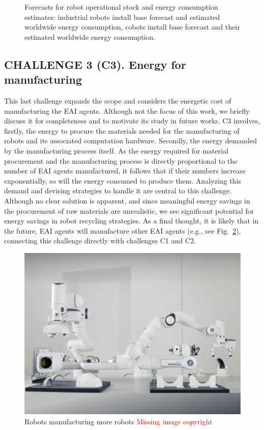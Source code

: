 \begin{figure}[!t]
	\hspace*{\fill}    
	\caption[] {\label{fig:robot_forecasts} Forecasts for robot operational stock and energy consumption estimates:  industrial robots install base forecast and  estimated worldwide energy consumption,  cobots install base forecast and their  estimated worldwide energy consumption.}
\end{figure}

\subsection{\textbf{CHALLENGE 3} (C3). Energy for manufacturing}
This last challenge expands the scope and considers the energetic cost of manufacturing the EAI agents. Although not the focus of this work, we briefly discuss it for completeness and to motivate its study in future works. C3 involves, firstly, the energy to procure the materials needed for the manufacturing of robots and its associated computation hardware. Secondly, the energy demanded by the manufacturing process itself. As the energy required for material procurement and the manufacturing process is directly proportional to the number of EAI agents manufactured, it follows that if their numbers increase exponentially, so will the energy consumed to produce them. Analyzing this demand and devising strategies to handle it are central to this challenge. Although no clear solution is apparent, and since meaningful energy savings in the procurement of raw materials are unrealistic, we see significant potential for energy savings in robot recycling strategies. As a final thought, it is likely that in the future, EAI agents will manufacture other EAI agents (e.g., see Fig.~\ref{fig:franka_builds_franka}), connecting this challenge directly with challenges C1 and C2.
\begin{figure}[!t]
	\centering
	\includegraphics[width=0.75\columnwidth]{fig/franka_builds_franka.jpg}
	\caption{Robots manufacturing more robots \textcolor{red}{Missing image copyright}}
	\label{fig:franka_builds_franka}
\end{figure}


